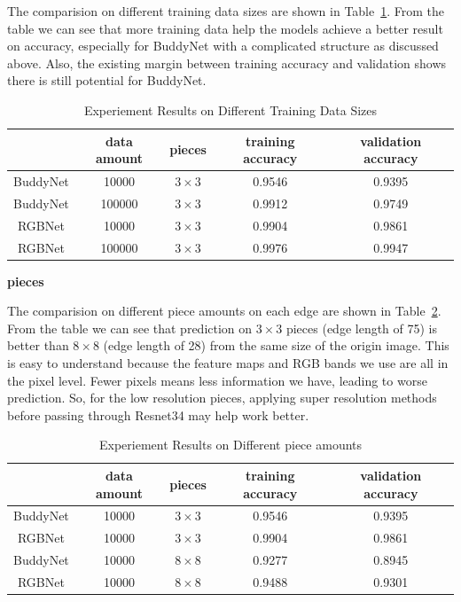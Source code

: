 \documentclass{article}
\begin{document}
The comparision on different training data sizes are shown in Table~\ref{tab:expamount}. From the table we can see that more training data help the models achieve a better result on accuracy, especially for BuddyNet with a complicated structure as discussed above. Also, the existing margin between training accuracy and validation shows there is still potential for BuddyNet.

\begin{table}
    \caption{Experiement Results on Different Training Data Sizes}
    \centering
    \label{tab:expamount}
    \begin{tabular}{c|c|c|c|c}
        \hline
        & data amount & pieces & training accuracy & validation accuracy\\
        \hline
        BuddyNet & 10000 & $3\times 3$ & 0.9546 & 0.9395\\
        \hline
        BuddyNet & 100000 & $3\times 3$ & 0.9912 & 0.9749\\
        \hline
        RGBNet & 10000 & $3\times 3$ & 0.9904 & 0.9861\\
        \hline
        RGBNet & 100000 & $3\times 3$ & 0.9976 & 0.9947\\
        \hline
    \end{tabular}
\end{table}

\textbf{pieces}

The comparision on different piece amounts on each edge are shown in Table~\ref{tab:exppiece}. From the table we can see that prediction on $3\times 3$ pieces (edge length of 75) is better than $8\times 8$ (edge length of 28) from the same size of the origin image. This is easy to understand because the feature maps and RGB bands we use are all in the pixel level. Fewer pixels means less information we have, leading to worse prediction. So, for the low resolution pieces, applying super resolution methods before passing through Resnet34 may help work better.

\begin{table}
    \caption{Experiement Results on Different piece amounts}
    \centering
    \label{tab:exppiece}
    \begin{tabular}{c|c|c|c|c}
        \hline
        & data amount & pieces & training accuracy & validation accuracy\\
        \hline
        BuddyNet & 10000 & $3\times 3$ & 0.9546 & 0.9395\\
        \hline
        RGBNet & 10000 & $3\times 3$ & 0.9904 & 0.9861\\
        \hline
        BuddyNet & 10000 & $8\times 8$ & 0.9277 & 0.8945\\
        \hline
        RGBNet & 10000 & $8\times 8$ & 0.9488 & 0.9301\\
        \hline
    \end{tabular}
\end{table}
\end{document}
